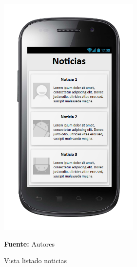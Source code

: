 \begin{figure}[!htb]
  \begin{center}
\includegraphics[width=7cm]{./imagenes/UI/Noticias/listado_noticias.png}
    \caption{Vista listado noticias}
    \label{fig:Vista_listado_noticias}
    \textbf{Fuente:}  Autores
  \end{center}
\end{figure}
